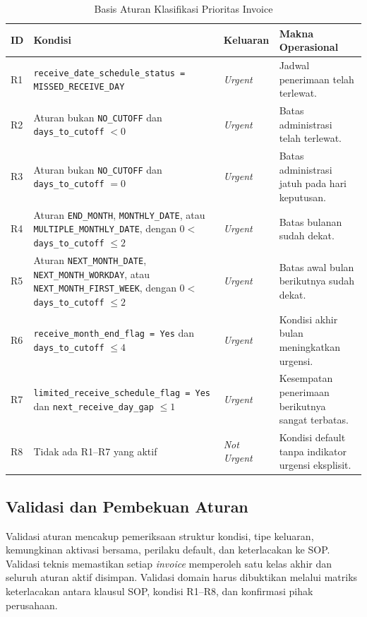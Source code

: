 \begin{table}[htbp]
    \centering
    \caption{Basis Aturan Klasifikasi Prioritas Invoice}
    \label{tab:rule-base-biner}
    \scriptsize
    \renewcommand{\arraystretch}{1.2}
    \begin{tabularx}{\textwidth}{p{}X p{}p{}}
        \toprule
        \textbf{ID} & \textbf{Kondisi} & \textbf{Keluaran} & \textbf{Makna Operasional} \\
        \midrule
        R1 & \texttt{receive\_date\_schedule\_status = MISSED\_RECEIVE\_DAY} & \textit{Urgent} & Jadwal penerimaan telah terlewat. \\
        R2 & Aturan bukan \texttt{NO\_CUTOFF} dan \texttt{days\_to\_cutoff} $< 0$ & \textit{Urgent} & Batas administrasi telah terlewat. \\
        R3 & Aturan bukan \texttt{NO\_CUTOFF} dan \texttt{days\_to\_cutoff} $= 0$ & \textit{Urgent} & Batas administrasi jatuh pada hari keputusan. \\
        R4 & Aturan \texttt{END\_MONTH}, \texttt{MONTHLY\_DATE}, atau \texttt{MULTIPLE\_MONTHLY\_DATE}, dengan $0 <$ \texttt{days\_to\_cutoff} $\leq 2$ & \textit{Urgent} & Batas bulanan sudah dekat. \\
        R5 & Aturan \texttt{NEXT\_MONTH\_DATE}, \texttt{NEXT\_MONTH\_WORKDAY}, atau \texttt{NEXT\_MONTH\_FIRST\_WEEK}, dengan $0 <$ \texttt{days\_to\_cutoff} $\leq 2$ & \textit{Urgent} & Batas awal bulan berikutnya sudah dekat. \\
        R6 & \texttt{receive\_month\_end\_flag = Yes} dan \texttt{days\_to\_cutoff} $\leq 4$ & \textit{Urgent} & Kondisi akhir bulan meningkatkan urgensi. \\
        R7 & \texttt{limited\_receive\_schedule\_flag = Yes} dan \texttt{next\_receive\_day\_gap} $\leq 1$ & \textit{Urgent} & Kesempatan penerimaan berikutnya sangat terbatas. \\
        R8 & Tidak ada R1--R7 yang aktif & \textit{Not Urgent} & Kondisi default tanpa indikator urgensi eksplisit. \\
        \bottomrule
    \end{tabularx}
\end{table}

\subsection{Validasi dan Pembekuan Aturan}

Validasi aturan mencakup pemeriksaan struktur kondisi, tipe keluaran, kemungkinan aktivasi bersama, perilaku default, dan keterlacakan ke SOP. Validasi teknis memastikan setiap \textit{invoice} memperoleh satu kelas akhir dan seluruh aturan aktif disimpan. Validasi domain harus dibuktikan melalui matriks keterlacakan antara klausul SOP, kondisi R1--R8, dan konfirmasi pihak perusahaan.

